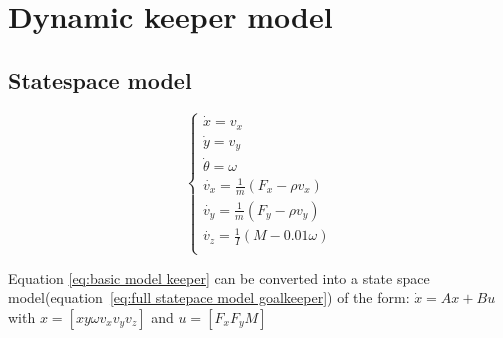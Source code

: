 \section{Dynamic keeper model}
\subsection{Statespace model}
\begin{equation}
\begin{cases}
	\dot{x} = v_x \\
	\dot{y} = v_y \\
	\dot{\theta}=\omega \\
	\dot{v_x} = \frac{1}{m}(F_x - \rho v_x)\\
	\dot{v_y} = \frac{1}{m}(F_y - \rho v_y)\\
	\dot{v_z} = \frac{1}{I}(M - 0.01\omega)\\
\end{cases}
\label{eq:basic model keeper}
\end{equation}

Equation \ref{eq:basic model keeper} can be converted into a state space model(equation~\ref{eq:full statepace model goalkeeper}) of the form: $\dot{x} = Ax+Bu$  with $x=[x y \omega v_x v_y v_z]$ and $u=[F_x F_y M]$

